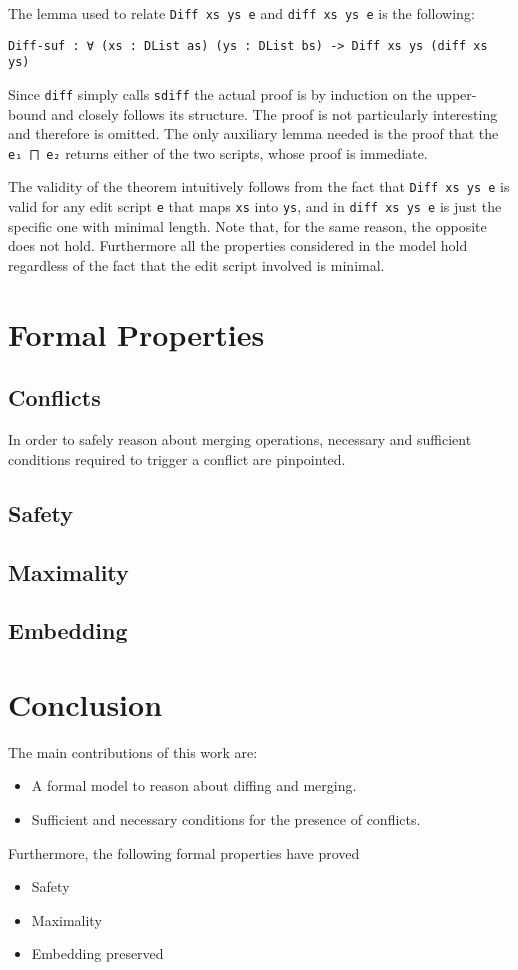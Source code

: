 \documentclass[../Thesis.tex]{subfiles}
\begin{document}
	The lemma used to relate \texttt{Diff xs ys e} and \texttt{diff xs ys e} 
	is the following:
\begin{verbatim}	
Diff-suf : ∀ (xs : DList as) (ys : DList bs) -> Diff xs ys (diff xs ys)
\end{verbatim}

	Since \texttt{diff} simply calls \texttt{sdiff} 	 the actual proof is 
	by induction on the upper-bound and closely follows its
	structure. The proof is not particularly interesting and therefore is omitted.
	The only auxiliary lemma needed is the proof that the \texttt{e₁ ⨅ e₂} 
	returns	either of the two scripts, whose proof is immediate.	

	The validity of the theorem intuitively follows from the fact that 
	\texttt{Diff xs ys e} is valid for any edit script \texttt{e} that maps 
	\texttt{xs} into \texttt{ys}, and in \texttt{diff xs ys e} is just the specific
	one with minimal length.
	Note that, for the same reason, the opposite does not hold.
	Furthermore all the properties considered in the model hold regardless of 
	the fact that the edit script involved is minimal.

\section{Formal Properties}
	\subsection{Conflicts}
		In order to safely reason about merging operations, necessary and 	
		sufficient conditions required to trigger a conflict are pinpointed.
		
	\subsection{Safety}

	\subsection{Maximality}

	\subsection{Embedding}

\section{Conclusion}

The main contributions of this work are:
\begin{itemize}
	\item A formal model to reason about diffing and merging.
	\item Sufficient and necessary conditions for the presence of conflicts.
\end{itemize}
	
Furthermore, the following formal properties 	have proved
\begin{itemize}
	\item Safety
	\item Maximality
	\item Embedding preserved
\end{itemize}
\end{document}
